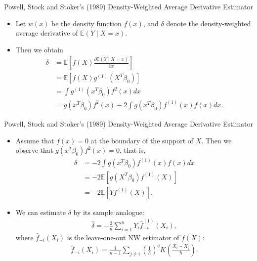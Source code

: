 \documentclass[xcolor=svgnames,dvipdfmx,cjk]{beamer}
\theoremstyle{example}
\def\E{\mathbb{E}}
\begin{document}
\begin{frame}{Powell, Stock and Stoker's (1989) Density-Weighted Average Derivative Estimator}
  \begin{itemize}
    \item Let $w(x)$ be the density function $f(x)$, 
          and $\delta$ denote \alert{the density-weighted average derivative} of $\E(Y \mid X=x)$.
    \item Then we obtain    
          \begin{align*}
          \delta &= \E \left[ f(X)
                          \frac {\partial \E(Y \mid X=x)}{\partial x}
                        \right] \\
                 &= \E \left[ f(X)
                          g^{(1)}(X^T \beta_0)
                        \right] \\
                 &= \int  g^{(1)}(x^T \beta_0) f^2(x) dx\\
                 &= g(x^T \beta_0)f^2(x)
                    - 2 \int g(x^T \beta_0) f^{(1)}(x) f(x) dx.
            \end{align*}   
  \end{itemize}
\end{frame}

\begin{frame}{Powell, Stock and Stoker's (1989) Density-Weighted Average Derivative Estimator}
\begin{itemize}
  \item Assume that $f(x)=0$ at the boundary of the support of $X$.
        Then we observe that $g(x^T \beta_0)f^2(x)= 0$, that is,
        \begin{align*}
        \delta &= - 2 \int g(x^T \beta_0) f^{(1)}(x) f(x) dx \\
               &= -2 \E [g(X^{T}\beta_0)f^{(1)}(X)] \\
               &= -2 \E [Y f^{(1)}(X)].
        \end{align*}    
  \item We can estimate $\delta$ by its sample analogue:
        \begin{align*}
          \hat{\delta} = - \frac{2}{n} \sum_{i=1}^{n} Y_i \hat{f}_{-i}^{(1)}(X_i),
        \end{align*}
        where $\hat{f}_{-i}(X_i)$ is the leave-one-out NW estimator of $f(X)$:
        \begin{align*}
          \hat{f}_{-i}(X_i) = \frac{1}{n-1} \sum_{j \neq i} \left(\frac{1}{h}\right)^q K \left( \frac{X_i - X_j}{h} \right).
        \end{align*}
\end{itemize}
\end{frame}
\end{document}
